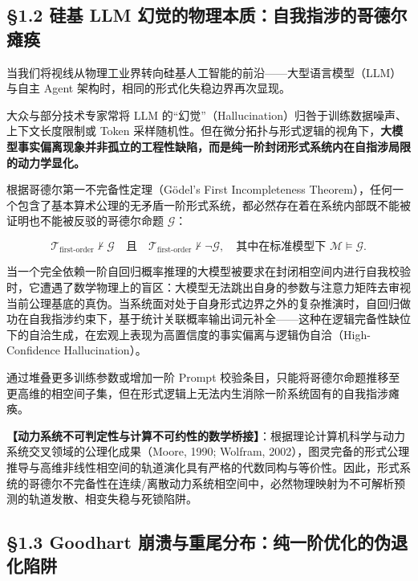 \documentclass[11pt,a4paper,oneside]{ctexart}
\begin{document}
\subsection{§1.2 硅基 LLM 幻觉的物理本质：自我指涉的哥德尔瘫痪}

当我们将视线从物理工业界转向硅基人工智能的前沿------大型语言模型（LLM）与自主 Agent 架构时，相同的形式化失稳边界再次显现。


大众与部分技术专家常将 LLM 的“幻觉”（Hallucination）归咎于训练数据噪声、上下文长度限制或 Token 采样随机性。但在微分拓扑与形式逻辑的视角下，\textbf{大模型事实偏离现象并非孤立的工程性缺陷，而是纯一阶封闭形式系统内在自指涉局限的动力学显化。}


根据哥德尔第一不完备性定理（Gödel's First Incompleteness Theorem），任何一个包含了基本算术公理的无矛盾一阶形式系统，都必然存在着在系统内部既不能被证明也不能被反驳的哥德尔命题 $\mathcal{G}$：


\begin{equation}
\mathcal{T}_{\text{first-order}} \nvdash \mathcal{G} \quad \text{且} \quad \mathcal{T}_{\text{first-order}} \nvdash \neg \mathcal{G}, \quad \text{其中在标准模型下 } \mathcal{M} \models \mathcal{G}.
\end{equation}

当一个完全依赖一阶自回归概率推理的大模型被要求在封闭相空间内进行自我校验时，它遭遇了数学物理上的盲区：大模型无法跳出自身的参数与注意力矩阵去审视当前公理基底的真伪。当系统面对处于自身形式边界之外的复杂推演时，自回归做功在自我指涉约束下，基于统计关联概率输出词元补全------这种在逻辑完备性缺位下的自洽生成，在宏观上表现为高置信度的事实偏离与逻辑伪自洽（High-Confidence Hallucination）。


通过堆叠更多训练参数或增加一阶 Prompt 校验条目，只能将哥德尔命题推移至更高维的相空间子集，但在形式逻辑上无法内生消除一阶系统固有的自我指涉瘫痪。


\begin{notebox}
\textbf{【动力系统不可判定性与计算不可约性的数学桥接】}：根据理论计算机科学与动力系统交叉领域的公理化成果（Moore, 1990; Wolfram, 2002），图灵完备的形式公理推导与高维非线性相空间的轨道演化具有严格的代数同构与等价性。因此，形式系统的哥德尔不完备性在连续/离散动力系统相空间中，必然物理映射为不可解析预测的轨道发散、相变失稳与死锁陷阱。
\end{notebox}

\subsection{§1.3 Goodhart 崩溃与重尾分布：纯一阶优化的伪退化陷阱}
\end{document}
